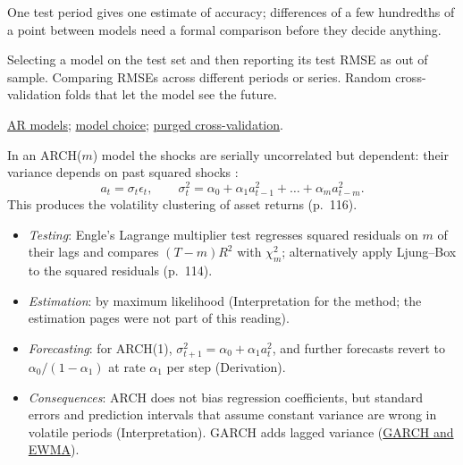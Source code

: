 \begin{qfmethod}
 One test period gives one estimate of accuracy; differences of a few hundredths of a point between models need a formal comparison before they decide anything.

 Selecting a model on the test set and then reporting its test RMSE as out of sample. Comparing RMSEs across different periods or series. Random cross-validation folds that let the model see the future.

 \hyperref[meth:autoregressive-forecasting]{AR models}; \hyperref[meth:time-series-model-selection]{model choice}; \hyperref[meth:purged-embargoed-cross-validation]{purged cross-validation}.

\end{qfmethod}

\begin{qfmodel}\label{mod:arch-conditional-variance}
 In an ARCH($m$) model the shocks are serially uncorrelated but dependent: their variance depends on past squared shocks \citep[pp.~115--116]{s7-tsay}:
\[ a_t=\sigma_t\epsilon_t,\qquad \sigma_t^2=\alpha_0+\alpha_1a_{t-1}^2+\dots+\alpha_ma_{t-m}^2. \]
This produces the volatility clustering of asset returns (p.~116).
\begin{itemize}
\item \emph{Testing}: Engle's Lagrange multiplier test regresses squared residuals on $m$ of their lags and compares $(T-m)R^2$ with $\chi^2_m$; alternatively apply Ljung--Box to the squared residuals (p.~114).
\item \emph{Estimation}: by maximum likelihood (Interpretation for the method; the estimation pages were not part of this reading).
\item \emph{Forecasting}: for ARCH(1), $\sigma^2_{t+1}=\alpha_0+\alpha_1a_t^2$, and further forecasts revert to $\alpha_0/(1-\alpha_1)$ at rate $\alpha_1$ per step (Derivation).
\item \emph{Consequences}: ARCH does not bias regression coefficients, but standard errors and prediction intervals that assume constant variance are wrong in volatile periods (Interpretation). GARCH adds lagged variance (\hyperref[mod:garch-volatility-forecast]{GARCH and EWMA}).
\end{itemize}


\end{qfmodel}
